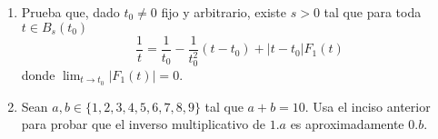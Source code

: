 \documentclass{article}
\theoremstyle{definition}
\begin{document}
\begin{enumerate}
              \begin{enumerate}
                \item Prueba que,  dado $t_0\ne 0$ fijo y arbitrario, existe $s>0$ tal que para toda $t\in B_s(t_0)$  
              $$
              \frac{1}{t}=\frac{1}{t_0}-\frac{1}{t_0^2}(t-t_0)+|t-t_0|F_1(t)
              $$
              donde $\lim_{t\to t_0} |F_1(t)| =0$.
            \item Sean $a,b\in \{1,2,3,4,5,6,7,8,9\}$ tal que $a+b=10$. Usa el inciso anterior para
              probar que el inverso multiplicativo de $1.a$ es aproximadamente $0.b$.
            \end{enumerate}
            
          

         
            
\end{enumerate}


  
       
\end{document}
